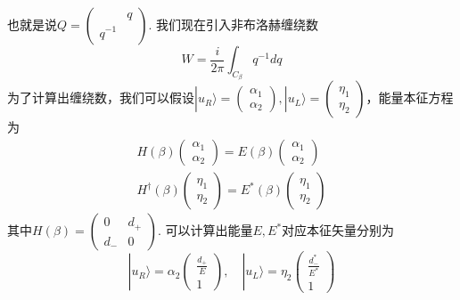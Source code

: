 \documentclass{article}
\begin{document}
也就是说$Q=\begin{pmatrix}
    &q\\
    q^{-1}&
\end{pmatrix}$. 我们现在引入非布洛赫缠绕数
\begin{equation}
    W=\frac{i}{2\pi}\int_{C_\beta}q^{-1}dq
\end{equation}
为了计算出缠绕数，我们可以假设$|u_R\rangle=\begin{pmatrix}
    \alpha_1\\
    \alpha_2
\end{pmatrix},|u_L\rangle=\begin{pmatrix}
    \eta_1\\
    \eta_2
\end{pmatrix}$，能量本征方程为
\begin{equation}
    \begin{split}
        H(\beta)\begin{pmatrix}
            \alpha_1\\
            \alpha_2
        \end{pmatrix}=E(\beta)\begin{pmatrix}
            \alpha_1\\
            \alpha_2
        \end{pmatrix}\\
        H^\dagger(\beta)\begin{pmatrix}
            \eta_1\\
            \eta_2
        \end{pmatrix}=E^*(\beta)\begin{pmatrix}
            \eta_1\\
            \eta_2
        \end{pmatrix}
    \end{split}
\end{equation}
其中$H(\beta)=\begin{pmatrix}
    0&d_+\\
    d_-&0
\end{pmatrix}$. 可以计算出能量$E,E^*$对应本征矢量分别为
\begin{equation}
    |u_R\rangle=\alpha_2\begin{pmatrix}
        \frac{d_+}{E}\\
        1
    \end{pmatrix},\quad |u_L\rangle=\eta_2\begin{pmatrix}
        \frac{d_-^*}{E^*}\\
        1
    \end{pmatrix}
\end{equation}
\end{document}
